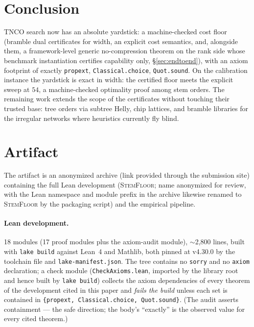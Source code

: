 \documentclass[sigplan,10pt,screen,review,anonymous]{acmart}
\newcommand{\sys}{\textsc{StemFloor}}  %
\begin{document}
\section{Conclusion}\label{sec:conclusion}

TNCO search now has an absolute yardstick: a machine-checked cost floor (bramble dual
certificates for width, an explicit cost semantics, and, alongside them, a framework-level
generic no-compression theorem on the rank side whose benchmark instantiation certifies
capability only, \S\ref{sec:endtoend}), with an axiom footprint of exactly
\texttt{propext}, \texttt{Classical.choice}, \texttt{Quot.sound}. On the calibration
instance the yardstick is exact in width: the certified floor meets the explicit sweep at
$54$, a machine-checked optimality proof among stem orders. The remaining work extends
the scope of the certificates without touching their trusted base: tree orders via
subtree Helly, chip lattices, and bramble libraries for the irregular networks where
heuristics currently fly blind.





\appendix
\section{Artifact}\label{app:artifact}

The artifact is an anonymized archive (link provided through the submission
site) containing the full Lean development (\sys{}; name anonymized for review,
with the Lean namespace and module prefix in the archive likewise renamed to
\sys{} by the packaging script) and the empirical pipeline.

\paragraph{Lean development.} 18 modules (17 proof modules plus the axiom-audit
module), $\sim$2{,}800 lines, built with
\texttt{lake build} against Lean~4 and Mathlib, both pinned at v4.30.0 by the
toolchain file and \texttt{lake-manifest.json}. The tree contains no
\texttt{sorry} and no \texttt{axiom} declaration; a check module
(\texttt{CheckAxioms.lean}, imported by the library root and
hence built by \texttt{lake build}) collects the axiom dependencies of every
theorem of the development cited in this paper and \emph{fails the build} unless
each set is contained in \texttt{\{propext, Classical.choice, Quot.sound\}}.
(The audit asserts containment --- the safe direction; the body's ``exactly''
is the observed value for every cited theorem.)
\end{document}
